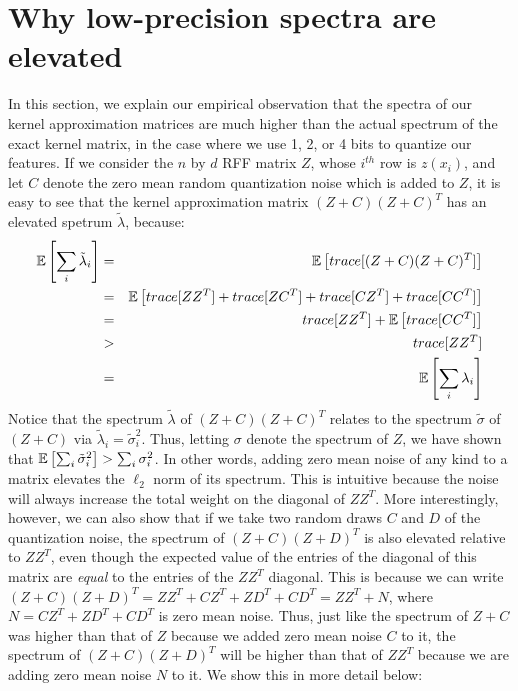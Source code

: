 \documentclass[12pt]{article}
\newcommand{\tsigma}{\tilde{\sigma}}
\newcommand{\tlambda}{\tilde{\lambda}}
\begin{document}
\section{Why low-precision spectra are elevated}
In this section, we explain our empirical observation that the spectra of our kernel approximation matrices are much higher than the actual spectrum of the exact kernel matrix, in the case where we use 1, 2, or 4 bits to quantize our features.  If we consider the $n$ by $d$ RFF matrix $Z$, whose $i^{th}$ row is $z(x_i)$, and let $C$ denote the zero mean random quantization noise which is added to $Z$, it is easy to see that the kernel approximation matrix $(Z+C)(Z+C)^T$ has an elevated spetrum $\tlambda$, because:
\begin{eqnarray*} 
\expect{}{\sum_i \tlambda_i} &=& \expect{}{trace[(Z+C)(Z+C)^T]} \\
&=& \expect{}{trace[ZZ^T] + trace[ZC^T] + trace[CZ^T] + trace[CC^T]}\\
&=& trace[ZZ^T] + \expect{}{trace[CC^T]} \\
&>& trace[ZZ^T] \\
&=& \expect{}{\sum_i \lambda_i}
\end{eqnarray*}
Notice that the spectrum $\tlambda$ of $(Z+C)(Z+C)^T$ relates to the spectrum $\tsigma$ of $(Z+C)$ via $\tlambda_i = \tsigma_i^2$.  Thus, letting $\sigma$ denote the spectrum of $Z$, we have shown that
$\expect{}{\sum_i \tsigma_i^2} > \sum_i \sigma_i^2$.  In other words, adding zero mean noise of any kind to a matrix elevates the $\ell_2$ norm of its spectrum.  This is intuitive because the noise will always increase the total weight on the diagonal of $ZZ^T$.
More interestingly, however, we can also show that if we take two random draws $C$ and $D$ of the quantization noise, the spectrum of $(Z+C)(Z+D)^T$ is also elevated relative to $ZZ^T$, even though the expected value of the entries of the diagonal of this matrix are \textit{equal} to the entries of the $ZZ^T$ diagonal.  This is because we can write $(Z+C)(Z+D)^T = ZZ^T + CZ^T + ZD^T + CD^T = ZZ^T + N$, where $N = CZ^T + ZD^T + CD^T$ is zero mean noise.  Thus, just like the spectrum of $Z+C$ was higher than that of $Z$ because we added zero mean noise $C$ to it, the spectrum of $(Z+C)(Z+D)^T$ will be higher than that of $ZZ^T$ because we are adding zero mean noise $N$ to it.  We show this in more detail below:
\end{document}
